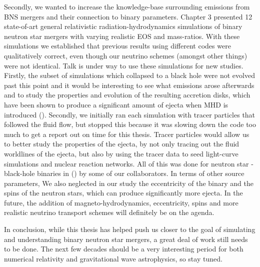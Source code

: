 Secondly, we wanted to increase the knowledge-base surrounding emissions from BNS mergers and their connection to binary parameters. Chapter 3 presented 12 state-of-art general relativistic radiation-hydrodynamics simulations of binary neutron star mergers with varying realistic EOS and mass-ratios.  With these simulations we established that previous results using different codes were qualitatively correct, even though our neutrino schemes (amongst other things) were not identical. Talk is under way to use these simulations for new studies. Firstly, the subset of simulations which collapsed to a black hole were not evolved past this point and it would be interesting to see what emissions arose afterwards and to study the properties and evolution of the resulting accretion disks, which have been shown to produce a significant amount of ejecta when MHD is introduced (\cite{fernandez2019long}). Secondly, we initially ran each simulation with tracer particles that followed the fluid flow, but stopped this because it was slowing down the code too much to get a report out on time for this thesis. Tracer particles would allow us to better study the properties of the ejecta, by not only tracing out the fluid worldlines of the ejecta, but also by using the tracer data to seed light-curve simulations and nuclear reaction networks. All of this was done for neutron star - black-hole binaries in (\cite{fernandez2016dynamics}) by some of our collaborators. In terms of other source parameters, We also neglected in our study the eccentricity of the binary and the spins of the neutron stars, which can produce significantly more ejecta. In the future, the addition of magneto-hydrodynamics, eccentricity, spins and more realistic neutrino transport schemes will definitely be on the agenda.

In conclusion, while this thesis has helped push us closer to the goal of simulating and understanding binary neutron star mergers, a great deal of work still needs to be done. The next few decades should be a very interesting period for both numerical relativity and gravitational wave astrophysics, so stay tuned.


